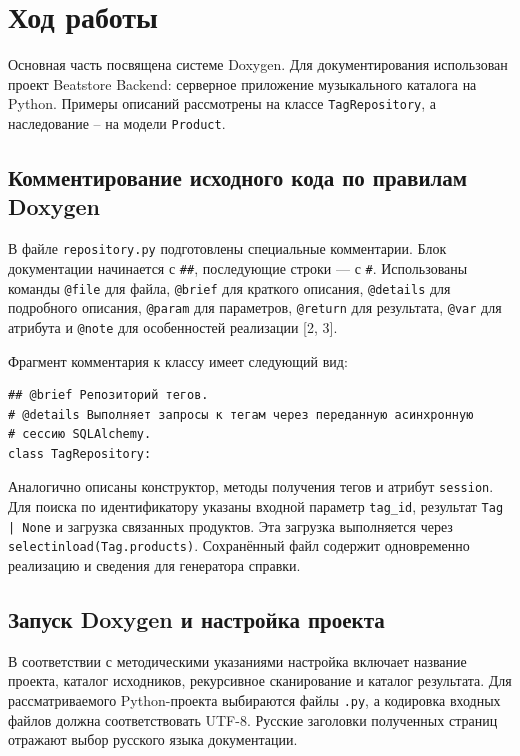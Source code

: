 \section{Ход работы}

Основная часть посвящена системе Doxygen. Для документирования использован проект
Beatstore Backend: серверное приложение музыкального каталога на Python.
Примеры описаний рассмотрены на классе \texttt{TagRepository},
а наследование -- на модели \texttt{Product}.

\subsection{Комментирование исходного кода по правилам Doxygen}

В файле \texttt{repository.py} подготовлены специальные комментарии.
Блок документации начинается с \verb|##|, последующие строки --- с \verb|#|.
Использованы команды \texttt{@file} для файла, \texttt{@brief} для краткого
описания, \texttt{@details} для подробного описания, \texttt{@param} для
параметров, \texttt{@return} для результата, \texttt{@var} для атрибута
и \texttt{@note} для особенностей реализации [2, 3].

Фрагмент комментария к классу имеет следующий вид:

\begingroup
\small
\renewcommand{\ttdefault}{\rmdefault}
\begin{verbatim}
## @brief Репозиторий тегов.
# @details Выполняет запросы к тегам через переданную асинхронную
# сессию SQLAlchemy.
class TagRepository:
\end{verbatim}
\endgroup

Аналогично описаны конструктор, методы получения тегов и атрибут
\texttt{session}. Для поиска по идентификатору указаны входной параметр
\verb|tag_id|, результат \verb!Tag | None! и загрузка связанных продуктов.
Эта загрузка выполняется через \verb|selectinload(Tag.products)|.
Сохранённый файл содержит одновременно реализацию и сведения для
генератора справки.

\subsection{Запуск Doxygen и настройка проекта}

В соответствии с методическими указаниями настройка включает название проекта,
каталог исходников, рекурсивное сканирование и каталог результата.
Для рассматриваемого Python-проекта выбираются файлы \texttt{.py},
а кодировка входных файлов должна соответствовать UTF-8.
Русские заголовки полученных страниц отражают выбор русского языка
документации.


